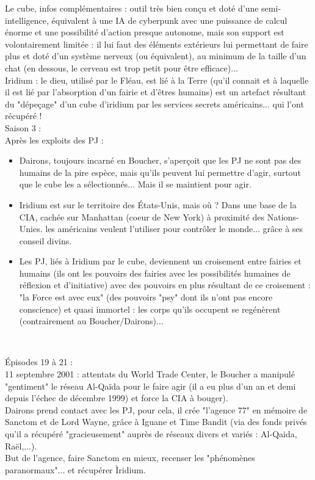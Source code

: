 \documentclass[11pt,twoside,a4paper]{book}
\begin{document}
Le cube, infos compl{\'e}mentaires : outil tr{\`e}s bien con\c{c}u et dot{\'e} d'une semi-intelligence, {\'e}quivalent {\`a} une IA de cyberpunk avec une puissance de calcul {\'e}norme et une possibilit{\'e} d'action presque autonome, mais son support est volontairement limit{\'e}e : il lui faut des {\'e}l{\'e}ments ext{\'e}rieurs lui permettant de faire plus et dot{\'e} d'un syst{\`e}me nerveux (ou {\'e}quivalent), au minimum de la taille d'un chat (en dessous, le cerveau est trop petit pour {\^e}tre efficace)... ~\\

Iridium : le dieu, utilis{\'e} par le Fl{\'e}au, est li{\'e} {\`a} la Terre (qu'il connait et {\`a} laquelle il est li{\'e} par l'absorption d'un fairie et d'{\^e}tres humains) est un artefact r{\'e}sultant du "d{\'e}pe\c{c}age" d'un cube d'iridium par les services secrets am{\'e}ricains... qui l'ont r{\'e}cup{\'e}r{\'e} ! ~\\

Saison 3 : ~\\
Apr{\`e}s les exploits des PJ : ~\\
\begin{itemize}
	\item Dairons, toujours incarn{\'e} en Boucher, s'aper\c{c}oit que les PJ ne sont pas des humains de la pire esp{\`e}ce, mais qu'ils peuvent lui permettre d'agir, surtout que le cube les a s{\'e}lectionn{\'e}s... Mais il se maintient pour agir.
	\item Iridium est sur le territoire des {\'E}tats-Unis, mais o{\`u} ? Dans une base de la CIA, cach{\'e}e sur Manhattan (coeur de New York) {\`a} proximit{\'e} des Nations-Unies. les am{\'e}ricains veulent l'utiliser pour contr{\^o}ler le monde... gr{\^a}ce {\`a} ses conseil divins.
	\item Les PJ, li{\'e}s {\`a} Iridium par le cube, deviennent un croisement entre fairies et humains (ils ont les pouvoirs des fairies avec les possibilit{\'e}s humaines de r{\'e}flexion et d'initiative) avec des pouvoirs en plus r{\'e}sultant de ce croisement : "la Force est avec eux" (des pouvoirs "psy" dont ils n'ont pas encore conscience) et quasi immortel : les corps qu'ils occupent se reg{\'e}n{\`e}rent (contrairement au Boucher/Dairons)...
\end{itemize}~\\

\clearpage

{\'E}pisodes 19 {\`a} 21 : ~\\
11 septembre 2001 : attentats du World Trade Center, le Boucher a manipul{\'e} "gentiment" le r{\'e}seau Al-Qa{\"i}da pour le faire agir (il a eu plus d'un an et demi depuis l'{\'e}chec de d{\'e}cembre 1999) et force la CIA {\`a} bouger). ~\\
Dairons prend contact avec les PJ, pour cela, il cr{\'e}e "l'agence 77" en m{\'e}moire de Sanctom et de Lord Wayne, gr{\^a}ce {\`a} Iguane et Time Bandit (via des fonds priv{\'e}s qu'il a r{\'e}cup{\'e}r{\'e} "gracieusement" aupr{\`e}s de r{\'e}seaux divers et vari{\'e}s : Al-Qaida, Ra{\"e}l,...). ~\\
But de l'agence, faire Sanctom en mieux, recenser les "ph{\'e}nom{\`e}nes paranormaux"... et r{\'e}cup{\'e}rer {\`I}ridium. ~\\
\end{document}

